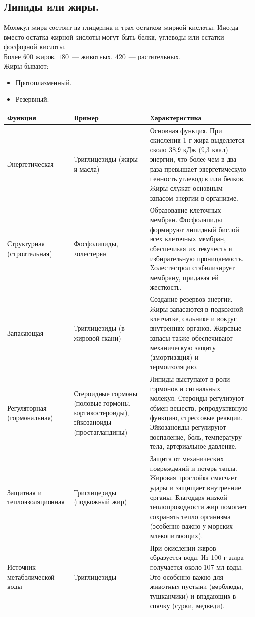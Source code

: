 \documentclass[12pt]{article}
\begin{document}
	\subsection{Липиды или жиры.}
	Молекул жира состоит из глицерина и трех остатков жирной кислоты. Иногда вместо остатка жирной кислоты могут быть белки, углеводы или остатки фосфорной кислоты. \\
	Более $600$ жиров. $180$~--- животных, $420$~--- растительных. \\
	Жиры бывают:
	\begin{itemize}
		\item Протоплазменный.
		\item Резервный.
	\end{itemize}
	\begin{xltabular}{\textwidth}{|X|X|X|}
		\hline
		Функция & Пример & Характеристика \\
		\hline
		Энергетическая & Триглицериды (жиры и масла) & Основная функция. При окислении 1 г жира выделяется около 38,9 кДж (9,3 ккал) энергии, что более чем в два раза превышает энергетическую ценность углеводов или белков. Жиры служат основным запасом энергии в организме. \\
		\hline
		Структурная (строительная) & Фосфолипиды, холестерин & Образование клеточных мембран. Фосфолипиды формируют липидный бислой всех клеточных мембран, обеспечивая их текучесть и избирательную проницаемость. Холестестрол стабилизирует мембрану, придавая ей жесткость. \\
		\hline
		Запасающая & Триглицериды (в жировой ткани) & Создание резервов энергии. Жиры запасаются в подкожной клетчатке, сальнике и вокруг внутренних органов. Жировые запасы также обеспечивают механическую защиту (амортизация) и термоизоляцию. \\
		\hline
		Регуляторная (гормональная) & Стероидные гормоны (половые гормоны, кортикостероиды), эйкозаноиды (простагландины) & Липиды выступают в роли гормонов и сигнальных молекул. Стероиды регулируют обмен веществ, репродуктивную функцию, стрессовые реакции. Эйкозаноиды регулируют воспаление, боль, температуру тела, артериальное давление. \\
		\hline
		Защитная и теплоизоляционная & Триглицериды (подкожный жир) & Защита от механических повреждений и потерь тепла. Жировая прослойка смягчает удары и защищает внутренние органы. Благодаря низкой теплопроводности жир помогает сохранять тепло организма (особенно важно у морских млекопитающих). \\
		\hline
		Источник метаболической воды & Триглицериды & При окислении жиров образуется вода. Из 100 г жира получается около 107 мл воды. Это особенно важно для животных пустыни (верблюды, тушканчики) и впадающих в спячку (сурки, медведи). \\

\end{xltabular}
\end{document}

